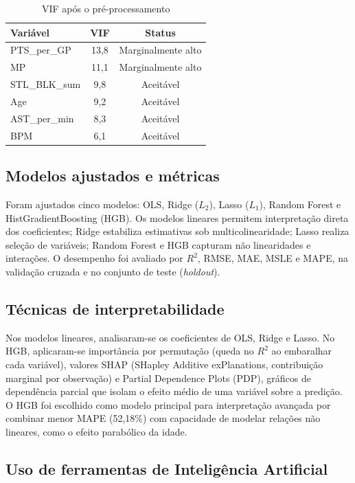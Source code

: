 \documentclass[11pt]{article}
\begin{document}
\begin{table}[H]
\centering
\caption{VIF após o pré-processamento}
\label{tab:vif_depois}
\small
\begin{tabular}{lcc}
\toprule
\textbf{Variável} & \textbf{VIF} & \textbf{Status} \\
\midrule
PTS\_per\_GP & 13,8 & Marginalmente alto \\
MP & 11,1 & Marginalmente alto \\
STL\_BLK\_sum & 9,8 & Aceitável \\
Age & 9,2 & Aceitável \\
AST\_per\_min & 8,3 & Aceitável \\
BPM & 6,1 & Aceitável \\
\bottomrule
\end{tabular}
\end{table}

\subsection{Modelos ajustados e métricas}

Foram ajustados cinco modelos: OLS, Ridge ($L_2$), Lasso ($L_1$), Random Forest e HistGradientBoosting (HGB). Os modelos lineares permitem interpretação direta dos coeficientes; Ridge estabiliza estimativas sob multicolinearidade; Lasso realiza seleção de variáveis; Random Forest e HGB capturam não linearidades e interações. O desempenho foi avaliado por $R^2$, RMSE, MAE, MSLE e MAPE, na validação cruzada e no conjunto de teste (\textit{holdout}).

\subsection{Técnicas de interpretabilidade}

Nos modelos lineares, analisaram-se os coeficientes de OLS, Ridge e Lasso. No HGB, aplicaram-se importância por permutação (queda no $R^2$ ao embaralhar cada variável), valores SHAP (SHapley Additive exPlanations, contribuição marginal por observação) e Partial Dependence Plots (PDP), gráficos de dependência parcial que isolam o efeito médio de uma variável sobre a predição. O HGB foi escolhido como modelo principal para interpretação avançada por combinar menor MAPE (52,18\%) com capacidade de modelar relações não lineares, como o efeito parabólico da idade.

\subsection{Uso de ferramentas de Inteligência Artificial}
\end{document}

